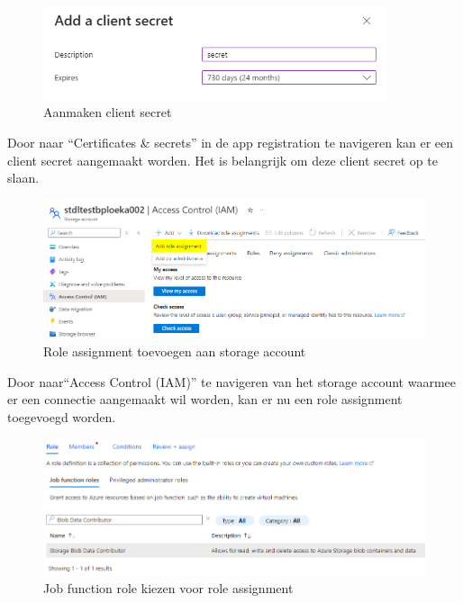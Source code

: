 \begin{figure}[H]
    \centering
    \includegraphics[width=0.9\textwidth]{./graphics/databricks/connection_3.png}
    \caption{Aanmaken client secret}
\end{figure}

Door naar ``Certificates \& secrets'' in de app registration te navigeren kan er een client secret aangemaakt worden. Het is belangrijk om deze client secret op te slaan.

\begin{figure}[H]
    \centering
    \includegraphics[width=1\textwidth]{./graphics/databricks/connection_4.png}
    \caption{Role assignment toevoegen aan storage account}
\end{figure}

Door naar``Access Control (IAM)'' te navigeren van het storage account waarmee er een connectie aangemaakt wil worden, kan er nu een role assignment toegevoegd worden.

\begin{figure}[H]
    \centering
    \includegraphics[width=1\textwidth]{./graphics/databricks/connection_5.png}
    \caption{Job function role kiezen voor role assignment}
\end{figure}

